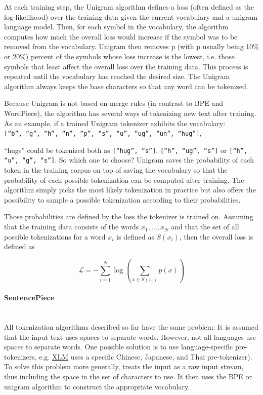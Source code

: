 At each training step, the Unigram algorithm defines a loss (often defined as the log-likelihood) over the training data given the current vocabulary and a unigram language model. Then, for each symbol in the vocabulary, the algorithm computes how much the overall loss would increase if the symbol was to be removed from the vocabulary. Unigram then removes p (with p usually being 10\% or 20\%) percent of the symbols whose loss increase is the lowest, i.e. those symbols that least affect the overall loss over the training data. This process is repeated until the vocabulary has reached the desired size. The Unigram algorithm always keeps the base characters so that any word can be tokenized.

Because Unigram is not based on merge rules (in contrast to BPE and WordPiece), the algorithm has several ways of
tokenizing new text after training. As an example, if a trained Unigram tokenizer exhibits the vocabulary:
\\
\texttt{[``b'', ``g'', ``h'', ``n'', ``p'', ``s'', ``u'', ``ug'', ``un'', ``hug'']},

``hugs'' could be tokenized both as \texttt{[``hug'', ``s'']}, \texttt{[``h'', ``ug'', ``s'']} or \texttt{[``h'', ``u'', ``g'', ``s'']}. So which one to choose? Unigram saves the probability of each token in the training corpus on top of saving the vocabulary so that the probability of each possible tokenization can be computed after training. The algorithm simply picks the most likely tokenization in practice but also offers the possibility to sample a possible tokenization according to their probabilities.

Those probabilities are defined by the loss the tokenizer is trained on. Assuming that the training data consists of the words $x_{1}, \dots, x_{N}$ and that the set of all possible tokenizations for a word $x_{i}$ is defined as $S(x_{i})$, then the overall loss is defined as

$$\mathcal{L} = -\sum_{i=1}^{N} \log \left ( \sum_{x \in S(x_{i})} p(x) \right )$$

\paragraph{SentencePiece}\mbox{}\\ \label{paragraph:sentetncepiece}
All tokenization algorithms described so far have the same problem: It is assumed that the input text uses spaces to separate words. However, not all languages use spaces to separate words. One possible solution is to use language-specific pre-tokenizers, e.g. \href{https://huggingface.co/docs/transformers/main/en/model_doc/xlm}{XLM} uses a specific Chinese, Japanese, and Thai pre-tokenizer). To solve this problem more generally, \cite{kudorichardson2018sentencepiece} treats the input as a raw input stream, thus including the space in the set of characters to use. It then uses the BPE or unigram algorithm to construct the appropriate vocabulary.

